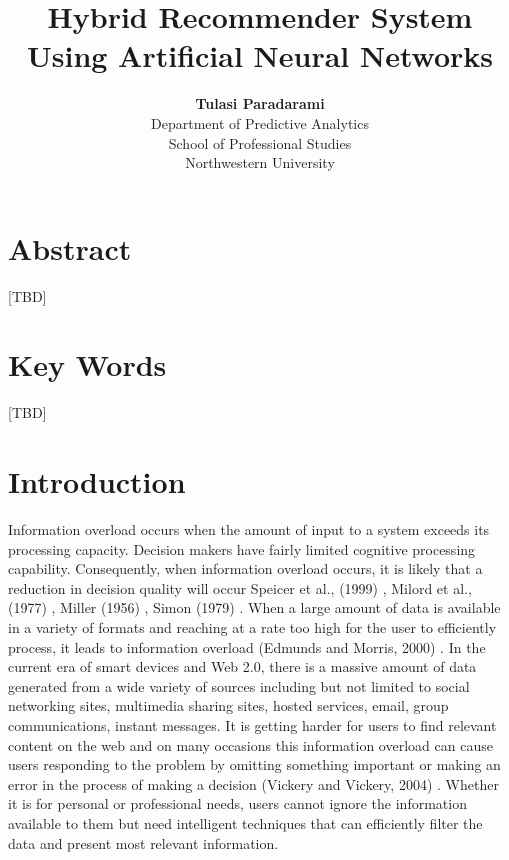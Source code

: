 \documentclass[12pt]{article}
\title{\textbf{Hybrid Recommender System \\Using Artificial Neural Networks}}
\author{\textbf{Tulasi Paradarami}\\Department of Predictive Analytics\\School of Professional Studies\\Northwestern University}
\date{}
\begin{document}
\maketitle
\normalsize

\section*{Abstract}

[TBD]

\section*{Key Words}

[TBD]

\newpage\section{Introduction}

Information overload occurs when the amount of input to a system exceeds its processing capacity. Decision makers have fairly limited cognitive processing capability. Consequently, when information overload occurs, it is likely that a reduction in decision quality will occur Speicer et al., (1999) \cite{speier}, Milord et al., (1977) \cite{milord}, Miller (1956) \cite{miller g. a. 1956.txt}, Simon (1979) \cite{simon h. a. 1979.txt}. When a large amount of data is available in a variety of formats and reaching at a rate too high for the user to efficiently process, it leads to information overload (Edmunds and Morris, 2000) \cite{edmunds}. In the current era of smart devices and Web 2.0, there is a massive amount of data generated from a wide variety of sources including but not limited to social networking sites, multimedia sharing sites, hosted services, email, group communications, instant messages. It is getting harder for users to find relevant content on the web and on many occasions this information overload can cause users responding to the problem by omitting something important or making an error in the process of making a decision (Vickery and Vickery, 2004) \cite{vickery}. Whether it is for personal or professional needs, users cannot ignore the information available to them but need intelligent techniques that can efficiently filter the data and present most relevant information.
\end{document}
